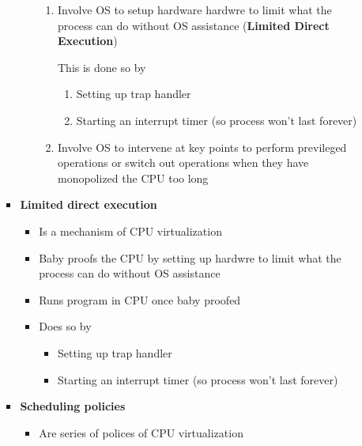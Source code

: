 \documentclass[12pt]{article}
\begin{document}
\begin{enumerate}[1.]
\begin{enumerate}[a)]
\begin{itemize}
\begin{itemize}
                \begin{enumerate}[1.]
                    \item Involve OS to setup hardware hardwre to limit what the process can do without OS assistance
                    (\textbf{Limited Direct Execution})

                    \bigskip

                    This is done so by

                    \bigskip

                    \begin{enumerate}[1.]
                        \item Setting up trap handler
                        \item Starting an interrupt timer (so process won't last forever)
                    \end{enumerate}
                    \item Involve OS to intervene at key points to perform previleged operations
                    or switch out operations when they have monopolized the CPU too long
                \end{enumerate}
                \bigskip
            \end{itemize}

            \item \textbf{Limited direct execution}

            \begin{itemize}
                \item Is a mechanism of CPU virtualization
                \item Baby proofs the CPU by setting up hardwre to limit what the process can do without OS assistance
                \item Runs program in CPU once baby proofed
                \item Does so by
                \begin{itemize}
                    \item Setting up trap handler
                    \item Starting an interrupt timer (so process won't last forever)
                \end{itemize}
            \end{itemize}

            \item \textbf{Scheduling policies}

            \begin{itemize}
                \item Are series of polices of CPU virtualization


\end{itemize}
\end{itemize}
\end{enumerate}
\end{enumerate}
\end{document}

